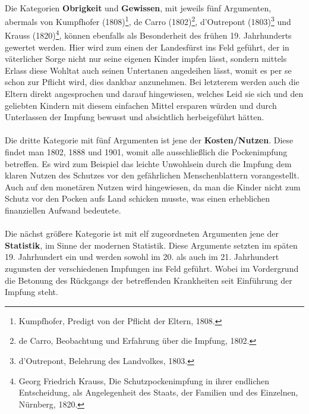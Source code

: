 \documentclass[
    a4paper,
    12pt,
    hyphens,
    chapterprefix=true,
    headheight=33pt,
    footheight=29pt,
    headings=optiontohead,
]{scrartcl}
\begin{document}
{\\
Die Kategorien \textbf{Obrigkeit} und \textbf{Gewissen}, mit jeweils fünf Argumenten, abermals von Kumpfhofer (1808)\footnote{Kumpfhofer, Predigt von der Pflicht der Eltern, 1808.}, de Carro (1802)\footnote{de Carro, Beobachtung und Erfahrung über die Impfung, 1802.}, d'Outrepont (1803)\footnote{d'Outrepont, Belehrung des Landvolkes, 1803.} und Krauss (1820)\footnote{Georg Friedrich Krauss, Die Schutzpockenimpfung in ihrer endlichen Entscheidung, als Angelegenheit des Staats, der Familien und des Einzelnen, Nürnberg, 1820.}, können ebenfalls als Besonderheit des frühen 19. Jahrhunderts gewertet werden. Hier wird zum einen der Landesfürst ins Feld geführt, der in väterlicher Sorge nicht nur seine eigenen Kinder impfen lässt, sondern mittels Erlass diese Wohltat auch seinen Untertanen angedeihen lässt, womit es per se schon zur Pflicht wird, dies dankbar anzunehmen. Bei letzterem werden auch die Eltern direkt angesprochen und darauf hingewiesen, welches Leid sie sich und den geliebten Kindern mit diesem einfachen Mittel ersparen würden und durch Unterlassen der Impfung bewusst und absichtlich herbeigeführt hätten.\\
\\
Die dritte Kategorie mit fünf Argumenten ist jene der \textbf{Kosten/Nutzen}. Diese findet man 1802, 1888 und 1901, womit alle ausschließlich die Pockenimpfung betreffen. Es wird zum Beispiel das leichte Unwohlsein durch die Impfung dem klaren Nutzen des Schutzes vor den gefährlichen Menschenblattern vorangestellt. Auch auf den monetären Nutzen wird hingewiesen, da man die Kinder nicht zum Schutz vor den Pocken aufs Land schicken musste, was einen erheblichen finanziellen Aufwand bedeutete.\\
\\
Die nächst größere Kategorie ist mit elf zugeordneten Argumenten jene der \textbf{Statistik}, im Sinne der modernen Statistik. Diese Argumente setzten im späten 19. Jahrhundert ein und werden sowohl im 20. als auch im 21. Jahrhundert zugunsten der verschiedenen Impfungen ins Feld geführt. Wobei im Vordergrund die Betonung des Rückgangs der betreffenden Krankheiten seit Einführung der Impfung steht.\\

}
\end{document}
